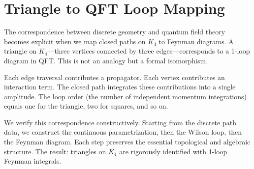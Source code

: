 \documentclass[11pt,a4paper]{book}
\begin{document}
\section{Triangle to QFT Loop Mapping}

The correspondence between discrete geometry and quantum field theory becomes explicit when we map closed paths on $K_4$ to Feynman diagrams.
A triangle on $K_4$---three vertices connected by three edges---corresponds to a 1-loop diagram in QFT.
This is not an analogy but a formal isomorphism.

Each edge traversal contributes a propagator. Each vertex contributes an interaction term.
The closed path integrates these contributions into a single amplitude. 
The loop order (the number of independent momentum integrations) equals one for the triangle, two for squares, and so on.

We verify this correspondence constructively.
Starting from the discrete path data, we construct the continuous parametrization, then the Wilson loop, then the Feynman diagram.
Each step preserves the essential topological and algebraic structure.
The result: triangles on $K_4$ are rigorously identified with 1-loop Feynman integrals.
\end{document}
